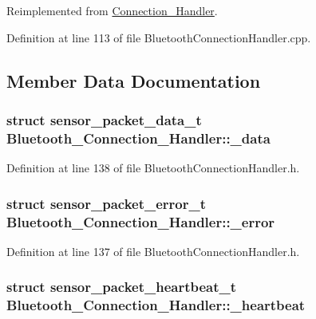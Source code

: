 \-Reimplemented from \hyperlink{class_connection___handler_a83c508842b867b95590df79417147289}{\-Connection\-\_\-\-Handler}.



\-Definition at line 113 of file \-Bluetooth\-Connection\-Handler.\-cpp.



\subsection{\-Member \-Data \-Documentation}
\hypertarget{class_bluetooth___connection___handler_ac3c60f26baa6646edf37adc23d5a8c87}{
\subsubsection[{\-\_\-data}]{\setlength{\rightskip}{0pt plus 5cm}struct {\bf sensor\-\_\-packet\-\_\-data\-\_\-t} {\bf \-Bluetooth\-\_\-\-Connection\-\_\-\-Handler\-::\-\_\-data}}}\label{class_bluetooth___connection___handler_ac3c60f26baa6646edf37adc23d5a8c87}


\-Definition at line 138 of file \-Bluetooth\-Connection\-Handler.\-h.

\hypertarget{class_bluetooth___connection___handler_ada27fa8b16ba3ab9a58fca77dcd198f1}{
\subsubsection[{\-\_\-error}]{\setlength{\rightskip}{0pt plus 5cm}struct {\bf sensor\-\_\-packet\-\_\-error\-\_\-t} {\bf \-Bluetooth\-\_\-\-Connection\-\_\-\-Handler\-::\-\_\-error}}}\label{class_bluetooth___connection___handler_ada27fa8b16ba3ab9a58fca77dcd198f1}


\-Definition at line 137 of file \-Bluetooth\-Connection\-Handler.\-h.

\hypertarget{class_bluetooth___connection___handler_ad6d8754c4db32e35a4ced0a2bcaede6d}{
\subsubsection[{\-\_\-heartbeat}]{\setlength{\rightskip}{0pt plus 5cm}struct {\bf sensor\-\_\-packet\-\_\-heartbeat\-\_\-t} {\bf \-Bluetooth\-\_\-\-Connection\-\_\-\-Handler\-::\-\_\-heartbeat}}}\label{class_bluetooth___connection___handler_ad6d8754c4db32e35a4ced0a2bcaede6d}


